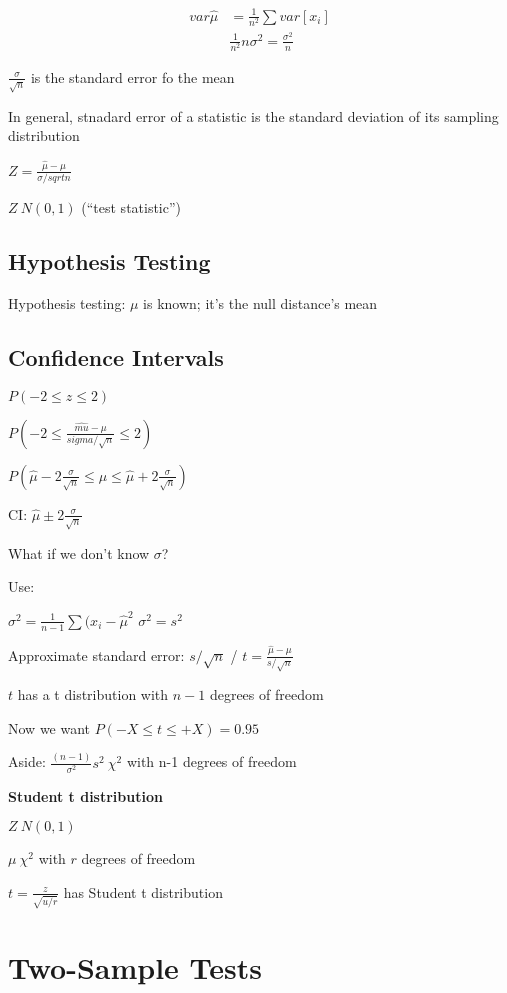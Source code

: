 \documentclass[twoside]{article}
\begin{document}
\begin{align}
var{\hat{\mu}} & = \frac{1}{n^2} \sum var[x_i] \\
& \frac{1}{n^2} n \sigma^2 = \frac{\sigma^2}{n}
\end{align}

$\frac{\sigma}{\sqrt{n}}$ is the standard error fo the mean

In general, stnadard error of a statistic is the standard deviation of its sampling distribution

$Z = \frac{\hat{\mu} - \mu}{\sigma/sqrt{n}}$

$Z ~ N(0,1)$ (``test statistic'')

\subsection{Hypothesis Testing}
Hypothesis testing: $\mu$ is known; it's the null distance's mean

\subsection{Confidence Intervals}

$P( -2 \leq z \leq 2 )$

$P( -2 \leq \frac{\hat{mu} - \mu}{sigma / \sqrt{n} } \leq 2 )$

$P( \hat{\mu} - 2 \frac{\sigma}{\sqrt{n}} \leq \mu \leq \hat{\mu} + 2 \frac{\sigma}{\sqrt{n}} )$

CI: $\hat{\mu} \pm 2 \frac{\sigma}{\sqrt{n}}$

What if we don't know $\sigma$?

Use:

$\sigma^2 = \frac{1}{n-1}\sum(x_i - \hat{\mu}^2$
$\sigma^2 = s^2$

Approximate standard error: $s/\sqrt{n}$
/
$t = \frac{\hat{\mu} - \mu}{s/\sqrt{n}}$

$t$ has a t distribution with $n-1$ degrees of freedom

Now we want $P(-X \leq t \leq +X ) = 0.95$

Aside: $\frac{(n-1)}{\sigma^2} s^2 ~ \chi^2$ with n-1 degrees of freedom

\textbf{Student t distribution}

$Z ~ N(0,1)$

$\mu ~ \chi^2$ with $r$ degrees of freedom

$t = \frac{z}{\sqrt{u/r}}$ has Student t distribution


\section{Two-Sample Tests}
\end{document}
